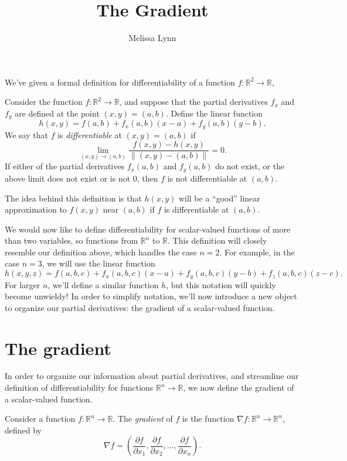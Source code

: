 \documentclass{ximera}
\title{The Gradient}
\author{Melissa Lynn}
\begin{document}
\begin{abstract}
\end{abstract}
\maketitle

We've given a formal definition for differentiability of a function $f:\mathbb{R}^2\rightarrow\mathbb{R}$,

\begin{definition}
Consider the function $f:\mathbb{R}^2\rightarrow\mathbb{R}$, and suppose that the partial derivatives $f_x$ and $f_y$ are defined at the point $(x,y)=(a,b)$. Define the linear function
\[
h(x,y) = f(a,b) + f_x(a,b)(x-a)+f_y(a,b)(y-b).
\]
We say that $f$ is \emph{differentiable} at $(x,y) = (a,b)$ if
\[
\lim_{(x,y)\rightarrow (a,b)}\frac{f(x,y) - h(x,y)}{\|(x,y)-(a,b)\|} = 0.
\]
If either of the partial derivatives $f_x(a,b)$ and $f_y(a,b)$ do not exist, or the above limit does not exist or is not $0$, then $f$ is not differentiable at $(a,b)$.
\end{definition}

The idea behind this definition is that $h(x,y)$ will be a ``good'' linear approximation to $f(x,y)$ near $(a,b)$ if $f$ is differentiable at $(a,b)$.

We would now like to define differentiability for scalar-valued functions of more than two variables, so functions from $\mathbb{R}^n$ to $\mathbb{R}$. This definition will closely resemble our definition above, which handles the case $n=2$. For example, in the case $n=3$, we will use the linear function
\[
h(x,y,z) = f(a,b,c) + f_x(a,b,c)(x-a) + f_y(a,b,c)(y-b)+f_z(a,b,c)(z-c).
\]
For larger $n$, we'll define a similar function $h$, but this notation will quickly become unwieldy! In order to simplify notation, we'll now introduce a new object to organize our partial derivatives: the gradient of a scalar-valued function.

\section*{The gradient}

In order to organize our information about partial derivatives, and streamline our definition of differentiability for functions $\mathbb{R}^n\rightarrow\mathbb{R}$, we now define the gradient of a scalar-valued function.

\begin{definition}
Consider a function $f:\mathbb{R}^n\rightarrow\mathbb{R}$. The \emph{gradient} of $f$ is the function $\nabla f:\mathbb{R}^n\rightarrow\mathbb{R}^n$, defined by
\[
\nabla f = \left(\frac{\partial f}{\partial x_1},\frac{\partial f}{\partial x_2},...,\frac{\partial f}{\partial x_n}\right).
\]
\end{definition}
\end{document}
